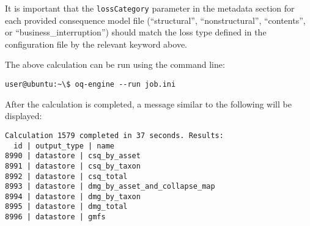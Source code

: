 It is important that the \Verb+lossCategory+ parameter in the metadata section
for each provided consequence model file (``structural'', ``nonstructural'',
``contents'', or ``business\_interruption'') should match the loss type
defined in the configuration file by the relevant keyword above.

The above calculation can be run using the command line:

\begin{verbatim}
user@ubuntu:~\$ oq-engine --run job.ini
\end{verbatim}

After the calculation is completed, a message similar to the following will be
displayed:

\begin{verbatim}
Calculation 1579 completed in 37 seconds. Results:
  id | output_type | name
8990 | datastore | csq_by_asset
8991 | datastore | csq_by_taxon
8992 | datastore | csq_total
8993 | datastore | dmg_by_asset_and_collapse_map
8994 | datastore | dmg_by_taxon
8995 | datastore | dmg_total
8996 | datastore | gmfs
\end{verbatim}
